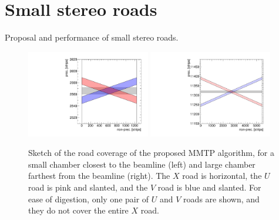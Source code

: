 \section{Small stereo roads}
\label{sec:stereoroads}

Proposal and performance of small stereo roads.

\begin{figure}[!htpb]
  \begin{center}
    \includegraphics[width=0.48\textwidth]{figures/cartoon_roads_small_smallstereo_1.pdf}
    \includegraphics[width=0.48\textwidth]{figures/cartoon_roads_large_smallstereo_1.pdf}
  \end{center}
  \vspace{-10pt}
  \caption{Sketch of the road coverage of the proposed MMTP algorithm, for a small chamber closest to the beamline (left) and large chamber farthest from the beamline (right). The $X$ road is horizontal, the $U$ road is pink and slanted, and the $V$ road is blue and slanted. For ease of digestion, only one pair of $U$ and $V$ roads are shown, and they do not cover the entire $X$ road.}
  \label{fig:cartoon_smallroads_1}
\end{figure}

